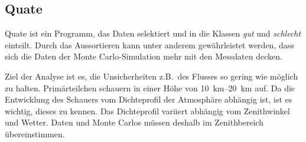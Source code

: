 \subsection{Quate}%
\label{sub:quate}

Quate ist ein Programm,
das
Daten selektiert und in die Klassen \textit{gut} und \textit{schlecht} einteilt.
Durch das Aussortieren kann unter anderem gewährleistet werden,
dass sich die Daten der Monte Carlo-Simulation mehr mit den Messdaten decken.








Ziel der Analyse ist es, die Unsicherheiten z.B.\ des Flusses so gering wie
möglich zu halten.
Primärteilchen schauern in einer Höhe von \SIrange{10}{20}{\kilo\meter}
auf.
Da die Entwicklung des Schauers vom Dichteprofil der Atmosphäre abhängig ist,
ist es wichtig, dieses zu kennen.
Das Dichteprofil variiert abhängig vom Zenithwinkel und Wetter.
Daten und Monte Carlos müssen deshalb im Zenithbereich übereinstimmen.



